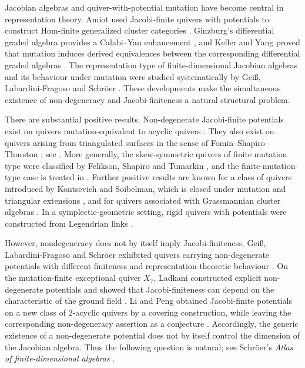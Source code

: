 \documentclass[11pt,letterpaper,reqno]{amsart}
\theoremstyle{definition}
\begin{document}
	Jacobian algebras and quiver-with-potential mutation have become central in
	representation theory.  Amiot used Jacobi-finite quivers with potentials to
	construct Hom-finite generalized cluster categories \cite{Amiot}.
	Ginzburg's differential graded algebra provides a Calabi--Yau enhancement
	\cite{Ginzburg}, and Keller and Yang proved that mutation induces derived
	equivalences between the corresponding differential graded algebras
	\cite{KellerYang}.  The representation type of finite-dimensional Jacobian
	algebras and its behaviour under mutation were studied systematically by
	Gei{\ss}, Labardini-Fragoso and Schr\"oer
	\cite{GeissLabardiniSchroer}.  These developments make the simultaneous
	existence of non-degeneracy and Jacobi-finiteness a natural structural
	problem.

    There are substantial positive results. Non-degenerate Jacobi-finite potentials exist on quivers mutation-equivalent to acyclic quivers \cite{DerksenWeymanZelevinsky,GeissLabardiniSchroer}. They also exist on quivers arising from triangulated surfaces in the sense of Fomin--Shapiro--Thurston \cite{FominShapiroThurston}; see \cite{LabardiniFragoso,LabardiniFragosoIV,LadkaniClosedSurfaces,TrepodeValdivieso,GeuenichLabardiniMiranda}. More generally, the skew-symmetric quivers of finite mutation type were classified by Felikson, Shapiro and Tumarkin \cite{FeliksonShapiroTumarkin}, and the finite-mutation-type case is treated in \cite{HaerizadehYurikusa}. Further positive results are known for a class of quivers introduced by Kontsevich and Soibelman, which is closed under mutation and triangular extensions \cite{LadkaniClassP}, and for quivers associated with Grassmannian cluster algebras \cite{ChangZhang}. In a symplectic-geometric setting, rigid quivers with potentials were
	constructed from Legendrian links \cite{CasalsGao}.
	
	
	However, nondegeneracy does not by itself imply Jacobi-finiteness.
	Gei{\ss}, Labardini-Fragoso and Schr\"oer exhibited quivers carrying
	non-degenerate potentials with different finiteness and
	representation-theoretic behaviour \cite{GeissLabardiniSchroer}.  On the mutation-finite 
	exceptional quiver $X_7$, Ladkani constructed explicit non-degenerate
	potentials and showed that Jacobi-finiteness can depend on the characteristic
	of the ground field \cite{LadkaniXSeven}.  Li and Peng obtained
	Jacobi-finite potentials on a new class of $2$-acyclic quivers by a covering
	construction, while leaving the corresponding non-degeneracy assertion as a
	conjecture \cite{LiPeng}.  Accordingly, the generic existence of a
	non-degenerate potential does not by itself control the dimension of the
	Jacobian algebra.  Thus the following question is natural; see Schr\"oer's \emph{Atlas of finite-dimensional algebras} \cite[Question~4.55]{SchroerAtlas}.
	
\end{document}
